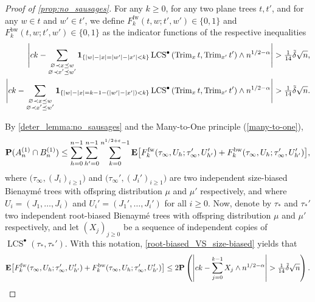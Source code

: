 \documentclass[11pt,reqno]{amsart}
\newcommand{\Trim}{\operatorname{Trim}}
\newcommand{\LCS}{\operatorname{LCS}}
\newcommand{\fw}{\mathrm{fw}}
\newcommand{\bw}{\mathrm{bw}}
\begin{document}
\begin{proof}[Proof of \cref{prop:no_sausages}]
    For any $k\geq 0$, for any two plane trees $t, t'$, and for any $w\in t$ and $w'\in t'$, we define $F_{k}^{\fw}(t,w;t',w')\in \{0,1\}$ and $F_k^{\bw}(t,w;t',w')\in\{0,1\}$ as the indicator functions of the respective inequalities
    \begin{align*}
    \Bigg|ck-\sum_{\substack{\varnothing \prec x\preceq w \\ \varnothing \prec x'\preceq w'}} \I{|w|-|x|=|w'|-|x'|<k} \LCS^\bullet\left(\Trim_{x} t,\Trim_{x'} t'\right)\wedge n^{1/2-\alpha}\Bigg|&>\tfrac{1}{14}\tilde\delta \sqrt{n},\\
    \Bigg|ck-\sum_{\substack{\varnothing \prec x\preceq w \\ \varnothing \prec x'\preceq w'}} \I{|w|-|x|=k-1-(|w'|-|x'|)<k} \LCS^\bullet\left(\Trim_{x} t,\Trim_{x'} t'\right)\wedge n^{1/2-\alpha}\Bigg|&>\tfrac{1}{14}\tilde\delta \sqrt{n}.
    \end{align*}
    
    By \cref{deter_lemma:no_sausages} and the Many-to-One principle (\cref{many-to-one}), 
    \begin{equation}\label{bound_B4}
    \prob(A_n^{(1)}\cap B^{(1)}_n)\le \sum_{h=0}^{n-1} \sum_{h'=0}^{n-1}\sum_{k=0}^{n^{1/2+\varepsilon}-1} \E\big[F_k^\fw(\tau_\infty,U_h; \tau'_\infty, U_{h'}')+F_k^\bw(\tau_\infty,U_h; \tau'_\infty, U_{h'}')\big],
    \end{equation}
    where $\big(\tau_\infty,(J_i)_{i\geq 1}\big)$ and $\big(\tau_\infty',(J_i')_{i\geq 1}\big)$ are two independent size-biased Bienaym\'{e} trees with offspring distribution $\mu$ and $\mu'$ respectively, and where $U_i = (J_1,\ldots,J_i)$ and $U_i' = (J_1',\ldots,J_i')$ for all $i\geq 0$. Now, denote by $\tau_{*}$ and $\tau_{*}'$ two independent root-biased Bienaym\'{e} trees with offspring distribution $\mu$ and $\mu'$ respectively, and let $(X_j)_{j\geq 0}$ be a sequence of independent copies of $\LCS^\bullet(\tau_*, \tau_*')$. With this notation, \cref{root-biased_VS_size-biased} yields that
    \[
        \E\big[F_k^\fw(\tau_\infty,U_h; \tau'_\infty, U_{h'}')+F_k^\bw(\tau_\infty,U_h; \tau'_\infty, U_{h'}')\big]\le 2 \prob\left(\left|ck-\sum_{j=0}^{k-1} X_j \wedge n^{1/2-\alpha}\right|>\tfrac{1}{14}\tilde\delta \sqrt{n} \right). 
    \]
    

\end{proof}
\end{document}
